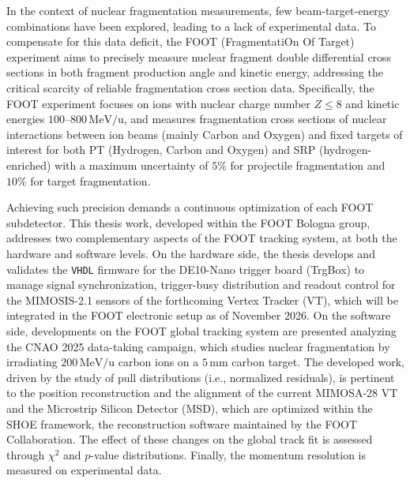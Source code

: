 In the context of nuclear fragmentation measurements, few beam-target-energy combinations have been explored, leading to a lack of experimental data. To compensate for this data deficit, the FOOT (FragmentatiOn Of Target) experiment aims to precisely measure nuclear fragment double differential cross sections in both fragment production angle and kinetic energy, addressing the critical scarcity of reliable fragmentation cross section data. Specifically, the FOOT experiment focuses on ions with nuclear charge number $Z\leq8$ and kinetic energies $100$--$800\,\mathrm{MeV/u}$, and measures fragmentation cross sections of nuclear interactions between ion beams (mainly Carbon and Oxygen) and fixed targets of interest for both PT (Hydrogen, Carbon and Oxygen) and SRP (hydrogen-enriched) with a maximum uncertainty of $5\%$ for projectile fragmentation and $10\%$ for target fragmentation.

Achieving such precision demands a continuous optimization of each FOOT subdetector. This thesis work, developed within the FOOT Bologna group, addresses two complementary aspects of the FOOT tracking system, at both the hardware and software levels. On the hardware side, the thesis develops and validates the \texttt{VHDL} firmware for the DE10-Nano trigger board (TrgBox) to manage signal synchronization, trigger-busy distribution and readout control for the MIMOSIS-2.1 sensors of the forthcoming Vertex Tracker (VT), which will be integrated in the FOOT electronic setup as of November 2026. On the software side, developments on the FOOT global tracking system are presented analyzing the CNAO 2025 data-taking campaign, which studies nuclear fragmentation by irradiating $200\,\mathrm{MeV/u}$ carbon ions on a $5\,\mathrm{mm}$ carbon target. The developed work, driven by the study of pull distributions (i.e., normalized residuals), is pertinent to the position reconstruction and the alignment of the current MIMOSA-28 VT and the Microstrip Silicon Detector (MSD), which are optimized within the SHOE framework, the reconstruction software maintained by the FOOT Collaboration. The effect of these changes on the global track fit is assessed through $\chi^2$ and $p$-value distributions. Finally, the momentum resolution is measured on experimental data.

